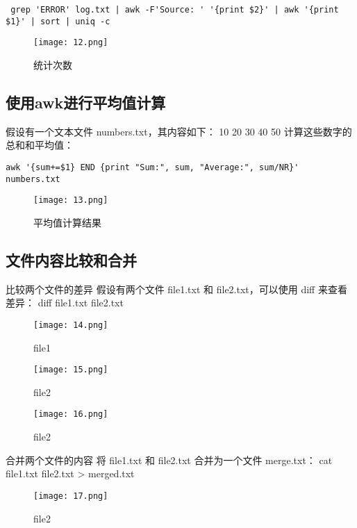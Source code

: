 \documentclass[a4paper, 12pt]{article}
\begin{document}
\begin{verbatim}
 grep 'ERROR' log.txt | awk -F'Source: ' '{print $2}' | awk '{print $1}' | sort | uniq -c
  \end{verbatim}

\begin{figure}[H]
  \centering
    \texttt{[image: 12.png]}
  \caption{统计次数}
   \end{figure}

\subsection{使用awk进行平均值计算}
假设有一个文本文件 numbers.txt，其内容如下：
10
20
30
40
50
计算这些数字的总和和平均值：
\begin{verbatim}
awk '{sum+=$1} END {print "Sum:", sum, "Average:", sum/NR}' numbers.txt
  \end{verbatim}
  
\begin{figure}[H]
  \centering
    \texttt{[image: 13.png]}
  \caption{平均值计算结果}
   \end{figure}

\subsection{文件内容比较和合并}
比较两个文件的差异
假设有两个文件 file1.txt 和 file2.txt，可以使用 diff 来查看差异：
diff file1.txt file2.txt
\begin{figure}[H]
  \centering
    \texttt{[image: 14.png]}
  \caption{file1}
   \end{figure}
   
\begin{figure}[H]
  \centering
    \texttt{[image: 15.png]}
  \caption{file2}
   \end{figure}


   \begin{figure}[H]
  \centering
    \texttt{[image: 16.png]}
  \caption{file2}
   \end{figure}
   
  合并两个文件的内容
将 file1.txt 和 file2.txt 合并为一个文件 merge.txt：
cat file1.txt file2.txt > merged.txt
\begin{figure}[H]
  \centering
    \texttt{[image: 17.png]}
  \caption{file2}
   \end{figure}
\end{document}
